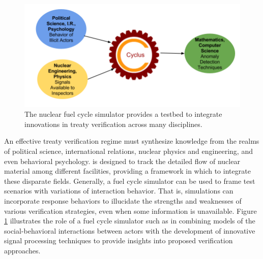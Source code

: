 \begin{figure}%
\begin{center}
\includegraphics[natwidth=162bp,natheight=227bp, scale=0.5]{./figs/cyclus_interdiscipline.png}
\end{center}
\caption{The \Cyclus nuclear fuel cycle simulator provides a testbed to integrate innovations in treaty verification across many disciplines.}
\label{fig:cyclus_diagram}
\end{figure}

An effective treaty verification regime must synthesize knowledge from the realms of political science, international relations, nuclear physics and engineering, and even behavioral psychology.  \Cyclus is designed to track the detailed flow of nuclear material among different facilities, providing a framework in which to integrate these disparate fields. Generally, a fuel cycle simulator can be used to frame test scenarios with variations of interaction behavior. That is, simulations can incorporate response behaviors to illucidate the strengths and weaknesses of various verification strategies, even when some information is unavailable. Figure \ref{fig:cyclus_diagram} illustrates  the role of a fuel cycle simulator such as \Cyclus in combining models of the social-behavioral interactions between actors with the development of innovative signal processing techniques to provide insights into proposed verification approaches. 


